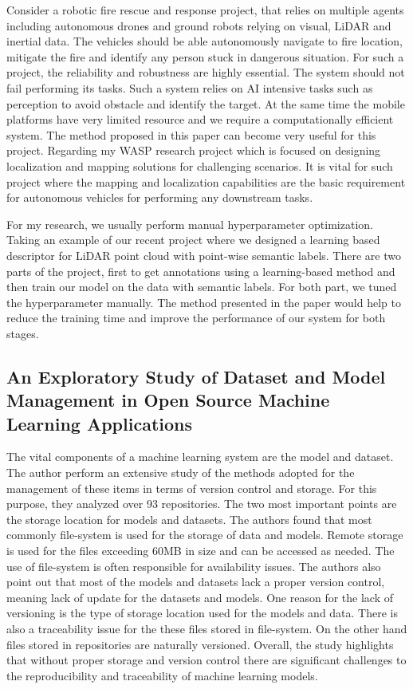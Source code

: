 \documentclass{article}
\begin{document}
Consider a robotic fire rescue and response project, that relies on multiple agents including autonomous drones and ground robots relying on visual, LiDAR and inertial data. The vehicles should be able autonomously navigate to fire location, mitigate the fire and identify any person stuck in dangerous situation. For such a project, the reliability and robustness are highly essential. The system should not fail performing its tasks. Such a system relies on AI intensive tasks such as perception to avoid obstacle and identify the target. At the same time the mobile platforms have very limited resource and we require a computationally efficient system. The method proposed in this paper can become very useful for this project. Regarding my WASP research project which is focused on designing localization and mapping solutions for challenging scenarios. It is vital for such project where the mapping and localization capabilities are the basic requirement for autonomous vehicles for performing any downstream tasks.

For my research, we usually perform manual hyperparameter optimization. Taking an example of our recent project where we designed a learning based  descriptor for LiDAR point cloud with point-wise semantic labels. There are two parts of the project, first to get annotations using a learning-based method and then train our model on the data with semantic labels. For both part, we tuned the hyperparameter manually. The method presented in the paper would help to reduce the training time and improve the performance of our system for both stages.


\subsection{An Exploratory Study of Dataset and Model Management in Open  Source Machine Learning Applications \cite{toma2024exploratory}}

The vital components of a machine learning system are the model and dataset. The author perform an extensive study of the methods adopted for the management of these items in terms of version control and storage. For this purpose, they analyzed over 93 repositories. The two most important points are the storage location for models and datasets. The authors found that most commonly file-system is used for the storage of data and models. Remote storage is used for the files exceeding 60MB in size and can be accessed as needed. The use of file-system is often responsible for availability issues. The authors also point out that most of the models and datasets lack a proper version control, meaning lack of update for the datasets and models. One reason for the lack of versioning is the type of storage location used for the models and data. There is also a traceability issue for the these files stored in file-system. On the other hand files stored in repositories are naturally versioned. Overall, the study highlights that without proper storage and version control there are significant challenges to the reproducibility and traceability of machine learning models. 
\end{document}
